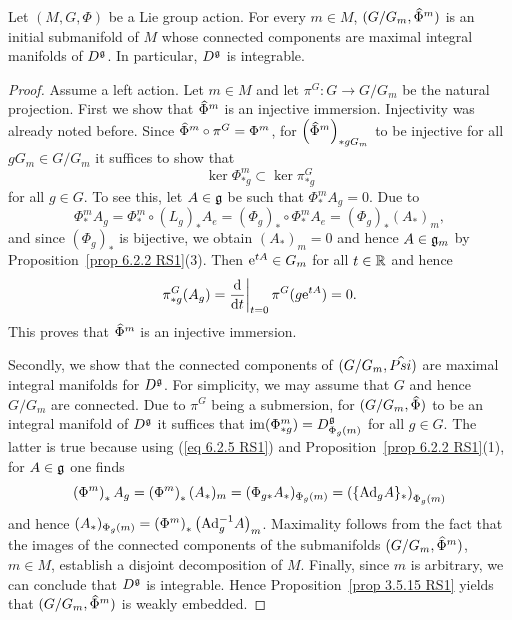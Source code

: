 \begin{thm}\label{thm 6.2.8 RS1 orbit}
    Let $(M,G,\Phi)$ be a Lie group action. For every $m\in M$, $(G\slash G_m,\wh{\Phi}^m)$ is an initial submanifold of $M$ whose connected components are maximal integral manifolds of $D^{\mathfrak{g}}$. In particular, $D^{\mathfrak{g}}$ is integrable.
\end{thm}
\begin{proof}
    Assume a left action. Let $m\in M$ and let $\pi^G:G\to G\slash G_m$ be the natural projection. First we show that $\wh{\Phi}^m$ is an injective immersion. Injectivity was already noted before. Since $\wh{\Phi}^m\circ \pi^G=\Phi^m$, for $\left(\wh{\Phi}^m\right)_{\ast gG_m}$ to be injective for all $gG_m\in G\slash G_m$ it suffices to show that
    \[\ker \Phi^m_{\ast g}\subset \ker \pi^G_{\ast g}\]
    for all $g\in G$. To see this, let $A\in\mathfrak{g}$ be such that $\Phi^m_{\ast}A_g=0$. Due to
    \[\Phi^m_{\ast}A_g=\Phi^m_{\ast}\circ \left(L_g\right)_{\ast}A_e=\left(\Phi_g\right)_{\ast}\circ \Phi^m_{\ast}A_e=\left(\Phi_g\right)_{\ast}(A_\ast)_m,\label{eq 6.2.5 RS1}\]
    and since $(\Phi_g)_\ast$ is bijective, we obtain $(A_\ast)_m=0$ and hence $A\in\mathfrak{g}_m$ by Proposition~\ref{prop 6.2.2 RS1}(3). Then $\mathrm{e}^{tA}\in G_m$ for all $t\in\mathbb{R}$ and hence
    \[\pi^G_{\ast g}(A_g)=\restr{\frac{\dd}{\dd t}}{t=0}\pi^G(g\rme^{tA})=0.\]
    This proves that $\wh{\Phi}^m$ is an injective immersion.

    Secondly, we show that the connected components of $(G\slash G_m,\wh{Psi})$ are maximal integral manifolds for $D^{\mathfrak{g}}$. For simplicity, we may assume that $G$ and hence $G\slash G_m$ are connected. Due to $\pi^G$ being a submersion, for $(G\slash G_m,\wh{\Phi})$ to be an integral manifold of $D^{\mathfrak{g}}$ it suffices that $\operatorname{im}(\Phi^m_{\ast g})=D^{\mathfrak{g}}_{\Phi_g(m)}$ for all $g\in G$. The latter is true because using  (\ref{eq 6.2.5 RS1}) and Proposition~\ref{prop 6.2.2 RS1}(1), for $A\in\mathfrak{g}$ one finds
    \[\left(\Phi^m\right)_{\ast}A_g=\left(\Phi^m\right)_{\ast}(A_\ast)_m=(\Phi_{g\ast }A_\ast)_{\Phi_g(m)}=\left(\{\mathrm{Ad}_g A\}_\ast\right)_{\Phi_g(m)}\]
    and hence $(A_\ast)_{\Phi_g(m)}=\left(\Phi^m\right)_{\ast}\left(\mathrm{Ad}_g^{-1}A\right)_m$. Maximality follows from the fact that the images of the connected components of the submanifolds $(G\slash G_m,\wh{\Phi}^m)$, $m\in M$, establish a disjoint decomposition of $M$. Finally, since $m $ is arbitrary, we can conclude that $D^{\mathfrak{g}}$ is integrable. Hence Proposition~\ref{prop 3.5.15 RS1} yields that $(G\slash G_m,\wh{\Phi}^m)$ is weakly embedded.
\end{proof}


